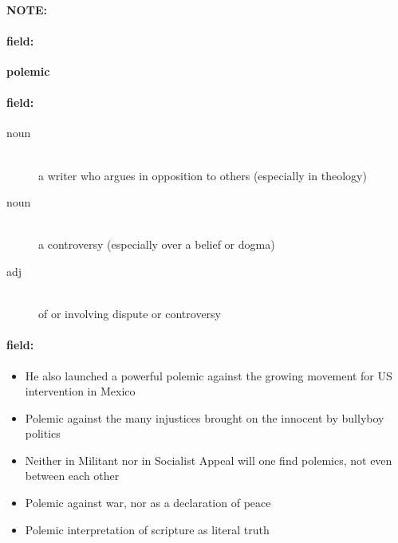 \documentclass[12pt]{article}
\newenvironment{note}{\paragraph{NOTE:}}{}
\newenvironment{field}{\paragraph{field:}}{}
\begin{document}
\begin{note}
\begin{field}
\textbf{\large polemic}
\end{field}


\begin{field}
\begin{description}
\item[noun] \hfill \\ 
a writer who argues in opposition to others (especially in theology)

\item[noun] \hfill \\ 
a controversy (especially over a belief or dogma)

\item[adj] \hfill \\ 
of or involving dispute or controversy

\end{description}
\end{field}

\begin{field}
\begin{itemize}
\item He also launched a powerful polemic against the growing movement for US intervention in Mexico
\item Polemic against the many injustices brought on the innocent by bullyboy politics
\item Neither in Militant nor in Socialist Appeal will one find polemics, not even between each other
\item Polemic against war, nor as a declaration of peace
\item Polemic interpretation of scripture as literal truth
\end{itemize}
\end{field}
\end{note}
\end{document}
